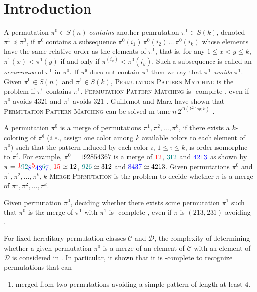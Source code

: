 \section{Introduction}
\label{section:Introduction}

A permutation $\pi^0 \in S(n)$ \emph{contains} another pemrutation $\pi^1 \in S(k)$,
denoted $\pi^1 \preceq \pi^0$, 
if $\pi^0$ contains a subsequence 
$\pi^0(i_1) \, \pi^0(i_2) \, \dots \, \pi^0(i_k)$ 
whose elements have the same relative order as the elements of $\pi^1$,
that is, for any $1 \leq x < y \leq k$,
$\pi^1(x) < \pi^1(y)$ if and only if
$\pi^(i_x) < \pi^0(i_y)$.
Such a subsequence is called an \emph{occurrence} of
$\pi^1$ in $\pi^0$.
If $\pi^0$ does not contain $\pi^1$ then we say that 
$\pi^1$ \emph{avoids} $\pi^1$.
Given $\pi^0 \in S(n)$ and $\pi^1 \in S(k)$,
\textsc{Permutation Pattern Matching} is the problem if 
$\pi^0$ contains $\pi^1$.
\textsc{Permutation Pattern Matching} is \NP-complete 
\cite{DBLP:journals/ipl/BoseBL98},
even if 
$\pi^0$ avoids $4321$ and $\pi^1$ avoids $321$
\cite{DBLP:conf/soda/JelinekK17}.
Guillemot and Marx have shown that \textsc{Permutation Pattern Matching} 
can be solved in time $n \, 2^{O(k^2 \log k)}$ 
\cite{DBLP:conf/soda/GuillemotM14}.

A permutation $\pi^0$ is a merge of permutations 
$\pi^1, \pi^2, \dots, \pi^k$, 
if there exists a $k$-coloring of $\pi^0$ (\emph{i.e.}, assign one color
among $k$ available colors to each element of $\pi^0$) such that the
pattern induced by each color $i$, $1 \leq i \leq k$, is order-isomorphic
to $\pi^i$.
For example, $\pi^0 = 192854367$ is a merge of  
${\color{red}12}$, ${\color{teal}312}$ and ${\color{blue}4213}$
as shown by 
$\pi = 
\raisebox{2pt}{{\color{red}1}}
\raisebox{0pt}{{\color{teal}92}}
\raisebox{-2pt}{{\color{blue}8}}
\raisebox{2pt}{{\color{red}5}}
\raisebox{-2pt}{{\color{blue}43}}
\raisebox{0pt}{{\color{teal}6}}
\raisebox{-2pt}{{\color{blue}7}}$,
${\color{red}15} \simeq 12$,
${\color{teal}926} \simeq 312$ and
${\color{blue}8437} \simeq 4213$.
Given permutations $\pi^0$ and $\pi^1, \pi^2, \dots, \pi^k$,
\textsc{$k$-Merge Permutation} is the problem to decide whether $\pi$
is a merge of $\pi^1, \pi^2, \dots, \pi^k$.


Given permutation $\pi^0$, deciding whether there exists some permutation 
$\pi^1$ such that $\pi^0$ is the merge of $\pi^1$ with $\pi^1$
is \NP-complete \cite{DBLP:journals/tcs/GiraudoV18},
even if $\pi$ is $(213, 231)$-avoiding
\cite{DBLP:journals/tcs/GiraudoV18,DBLP:journals/tcs/BulteauV20}.


For fixed hereditary permutation classes $\mathcal{C}$ and $\mathcal{D}$,
the complexity of determining whether a given permutation $\pi^0$ is a merge of an element of
$\mathcal{C}$ with an element of $\mathcal{D}$ is considered in
\cite{DBLP:conf/esa/JelinekOV18}.
In particular, it shown that it is \NP-complete to recognize permutations that can \begin{enumerate}
  \item merged from two permutations avoiding a simple pattern of length at least $4$.
\end{enumerate}